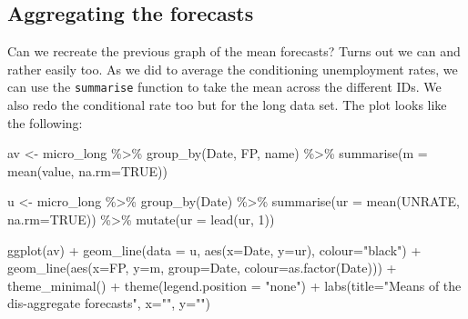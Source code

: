 \documentclass[
  letterpaper,
]{book}
\newenvironment{Shaded}{\begin{snugshade}}{\end{snugshade}}
\newcommand{\AttributeTok}[1]{\textcolor[rgb]{0.40,0.45,0.13}{#1}}
\newcommand{\ConstantTok}[1]{\textcolor[rgb]{0.56,0.35,0.01}{#1}}
\newcommand{\DecValTok}[1]{\textcolor[rgb]{0.68,0.00,0.00}{#1}}
\newcommand{\FunctionTok}[1]{\textcolor[rgb]{0.28,0.35,0.67}{#1}}
\newcommand{\NormalTok}[1]{\textcolor[rgb]{0.00,0.23,0.31}{#1}}
\newcommand{\OtherTok}[1]{\textcolor[rgb]{0.00,0.23,0.31}{#1}}
\newcommand{\SpecialCharTok}[1]{\textcolor[rgb]{0.37,0.37,0.37}{#1}}
\newcommand{\StringTok}[1]{\textcolor[rgb]{0.13,0.47,0.30}{#1}}
\begin{document}
\hypertarget{aggregating-the-forecasts}{%
\subsection{Aggregating the forecasts}\label{aggregating-the-forecasts}}

Can we recreate the previous graph of the mean forecasts? Turns out we
can and rather easily too. As we did to average the conditioning
unemployment rates, we can use the \texttt{summarise} function to take
the mean across the different IDs. We also redo the conditional rate too
but for the long data set. The plot looks like the following:

\begin{Shaded}
\begin{Highlighting}[]
\NormalTok{av }\OtherTok{\textless{}{-}}\NormalTok{ micro\_long }\SpecialCharTok{\%\textgreater{}\%} 
  \FunctionTok{group\_by}\NormalTok{(Date, FP, name) }\SpecialCharTok{\%\textgreater{}\%} 
  \FunctionTok{summarise}\NormalTok{(}\AttributeTok{m =} \FunctionTok{mean}\NormalTok{(value, }\AttributeTok{na.rm=}\ConstantTok{TRUE}\NormalTok{))}

\NormalTok{u }\OtherTok{\textless{}{-}}\NormalTok{ micro\_long }\SpecialCharTok{\%\textgreater{}\%} 
  \FunctionTok{group\_by}\NormalTok{(Date) }\SpecialCharTok{\%\textgreater{}\%} 
  \FunctionTok{summarise}\NormalTok{(}\AttributeTok{ur =} \FunctionTok{mean}\NormalTok{(UNRATE, }\AttributeTok{na.rm=}\ConstantTok{TRUE}\NormalTok{)) }\SpecialCharTok{\%\textgreater{}\%} 
  \FunctionTok{mutate}\NormalTok{(}\AttributeTok{ur =} \FunctionTok{lead}\NormalTok{(ur, }\DecValTok{1}\NormalTok{))}

\FunctionTok{ggplot}\NormalTok{(av) }\SpecialCharTok{+} 
  \FunctionTok{geom\_line}\NormalTok{(}\AttributeTok{data =}\NormalTok{ u, }\FunctionTok{aes}\NormalTok{(}\AttributeTok{x=}\NormalTok{Date, }\AttributeTok{y=}\NormalTok{ur), }\AttributeTok{colour=}\StringTok{"black"}\NormalTok{) }\SpecialCharTok{+} 
  \FunctionTok{geom\_line}\NormalTok{(}\FunctionTok{aes}\NormalTok{(}\AttributeTok{x=}\NormalTok{FP, }\AttributeTok{y=}\NormalTok{m, }\AttributeTok{group=}\NormalTok{Date, }\AttributeTok{colour=}\FunctionTok{as.factor}\NormalTok{(Date))) }\SpecialCharTok{+} 
  \FunctionTok{theme\_minimal}\NormalTok{() }\SpecialCharTok{+}
  \FunctionTok{theme}\NormalTok{(}\AttributeTok{legend.position =} \StringTok{"none"}\NormalTok{) }\SpecialCharTok{+} 
  \FunctionTok{labs}\NormalTok{(}\AttributeTok{title=}\StringTok{"Means of the dis{-}aggregate forecasts"}\NormalTok{, }\AttributeTok{x=}\StringTok{""}\NormalTok{, }\AttributeTok{y=}\StringTok{""}\NormalTok{)}
\end{Highlighting}
\end{Shaded}
\end{document}
